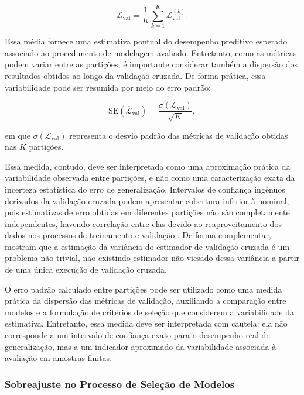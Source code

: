\begin{equation}
\overline{\mathcal{L}}_{\mathrm{val}} =
\frac{1}{K}\sum_{k=1}^{K} \mathcal{L}^{(k)}_{\mathrm{val}}.
\label{eq:media_validacao}
\end{equation}

\noindent Essa média fornece uma estimativa pontual do desempenho preditivo esperado associado ao procedimento de modelagem avaliado. Entretanto, como as métricas podem variar entre as partições, é importante considerar também a dispersão dos resultados obtidos ao longo da validação cruzada. De forma prática, essa variabilidade pode ser resumida por meio do erro padrão:

\begin{equation}
\mathrm{SE}(\overline{\mathcal{L}}_{\mathrm{val}}) =
\frac{\sigma(\mathcal{L}_{\mathrm{val}})}{\sqrt{K}},
\label{eq:erro_padrao_validacao}
\end{equation}

\noindent em que \(\sigma(\mathcal{L}_{\mathrm{val}})\) representa o desvio padrão das métricas de validação obtidas nas \(K\) partições.

Essa medida, contudo, deve ser interpretada como uma aproximação prática da variabilidade observada entre partições, e não como uma caracterização exata da incerteza estatística do erro de generalização. Intervalos de confiança ingênuos derivados da validação cruzada podem apresentar cobertura inferior à nominal, pois estimativas de erro obtidas em diferentes partições não são completamente independentes, havendo correlação entre elas devido ao reaproveitamento dos dados nos processos de treinamento e validação \cite{Bates2022CV}. De forma complementar, \cite{BengioGrandvalet2003VarianceKFold} mostram que a estimação da variância do estimador de validação cruzada é um problema não trivial, não existindo estimador não viesado dessa variância a partir de uma única execução de validação cruzada.

O erro padrão calculado entre partições pode ser utilizado como uma medida prática da dispersão das métricas de validação, auxiliando a comparação entre modelos e a formulação de critérios de seleção que considerem a variabilidade da estimativa. Entretanto, essa medida deve ser interpretada com cautela: ela não corresponde a um intervalo de confiança exato para o desempenho real de generalização, mas a um indicador aproximado da variabilidade associada à avaliação em amostras finitas.


\subsubsection*{Sobreajuste no Processo de Seleção de Modelos}

